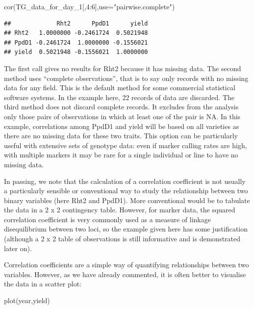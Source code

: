 \documentclass[
]{book}
\newenvironment{Shaded}{\begin{snugshade}}{\end{snugshade}}
\newcommand{\AttributeTok}[1]{\textcolor[rgb]{0.77,0.63,0.00}{#1}}
\newcommand{\DecValTok}[1]{\textcolor[rgb]{0.00,0.00,0.81}{#1}}
\newcommand{\FunctionTok}[1]{\textcolor[rgb]{0.00,0.00,0.00}{#1}}
\newcommand{\NormalTok}[1]{#1}
\newcommand{\SpecialCharTok}[1]{\textcolor[rgb]{0.00,0.00,0.00}{#1}}
\newcommand{\StringTok}[1]{\textcolor[rgb]{0.31,0.60,0.02}{#1}}
\begin{document}
\begin{Shaded}
\begin{Highlighting}[]
\FunctionTok{cor}\NormalTok{(TG\_data\_for\_day\_1[,}\DecValTok{4}\SpecialCharTok{:}\DecValTok{6}\NormalTok{],}\AttributeTok{use=}\StringTok{"pairwise.complete"}\NormalTok{)}
\end{Highlighting}
\end{Shaded}

\begin{verbatim}
##             Rht2      PpdD1      yield
## Rht2   1.0000000 -0.2461724  0.5021948
## PpdD1 -0.2461724  1.0000000 -0.1556021
## yield  0.5021948 -0.1556021  1.0000000
\end{verbatim}

The first call gives no results for Rht2 because it has missing data. The second method uses ``complete observations'', that is to say only records with no missing data for any field. This is the default method for some commercial statistical software systems. In the example here, 22 records of data are discarded. The third method does not discard complete records. It excludes from the analysis only those pairs of observations in which at least one of the pair is NA. In this example, correlations among PpdD1 and yield will be based on all varieties as there are no missing data for these two traits. This option can be particularly useful with extensive sets of genotype data: even if marker calling rates are high, with multiple markers it may be rare for a single individual or line to have no missing data.

In passing, we note that the calculation of a correlation coefficient is not usually a particularly sensible or conventional way to study the relationship between two binary variables (here Rht2 and PpdD1). More conventional would be to tabulate the data in a 2 x 2 contingency table. However, for marker data, the squared correlation coefficient is very commonly used as a measure of linkage disequilibrium between two loci, so the example given here has some justification (although a 2 x 2 table of observations is still informative and is demonstrated later on).

Correlation coefficients are a simple way of quantifying relationships between two variables. However, as we have already commented, it is often better to visualise the data in a scatter plot:

\begin{Shaded}
\begin{Highlighting}[]
\FunctionTok{plot}\NormalTok{(year,yield)}
\end{Highlighting}
\end{Shaded}
\end{document}
